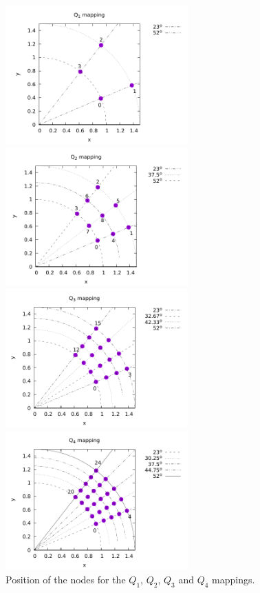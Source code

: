 \begin{center}
\includegraphics[width=7cm]{images/mappings/curved/nodesQ1.pdf}
\includegraphics[width=7cm]{images/mappings/curved/nodesQ2.pdf}\\
\includegraphics[width=7cm]{images/mappings/curved/nodesQ3.pdf}
\includegraphics[width=7cm]{images/mappings/curved/nodesQ4.pdf}\\
{\captionfont Position of the nodes for the $Q_1$, $Q_2$, $Q_3$ and $Q_4$ mappings.}
\end{center}

